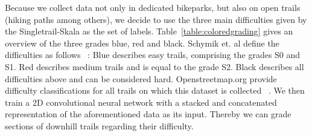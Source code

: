 \documentclass[runningheads]{llncs}
\begin{document}
Because we collect data not only in dedicated bikeparks, but also on open trails (hiking paths among others), we decide to use the three main difficulties given by the Singletrail-Skala as the set of labels.
Table~\ref{table:coloredgrading} gives an overview of the three grades blue, red and black.
Schymik et. al define the difficulties as follows ~\cite{osmsingletrails}:
Blue describes easy trails, comprising the grades S0 and S1.
Red describes medium trails and is equal to the grade S2.
Black describes all difficulties above and can be considered hard.
Openstreetmap.org provide difficulty classifications for all trails on which this dataset is collected ~\cite{osmsingletrails}.
We then train a 2D convolutional neural network with a stacked and concatenated representation of the aforementioned data as its input.
Thereby we can grade sections of downhill trails regarding their difficulty.
\end{document}

